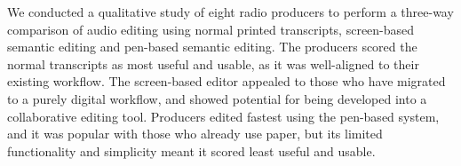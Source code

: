We conducted a qualitative study of eight radio producers to perform a three-way comparison of audio editing using
normal printed transcripts, screen-based semantic editing and pen-based semantic editing. The producers scored the
normal transcripts as most useful and usable, as it was well-aligned to their existing workflow. The screen-based
editor appealed to those who have migrated to a purely digital workflow, and showed potential for being developed into
a collaborative editing tool. Producers edited fastest using the pen-based system, and it was popular with those who
already use paper, but its limited functionality and simplicity meant it scored least useful and usable.
